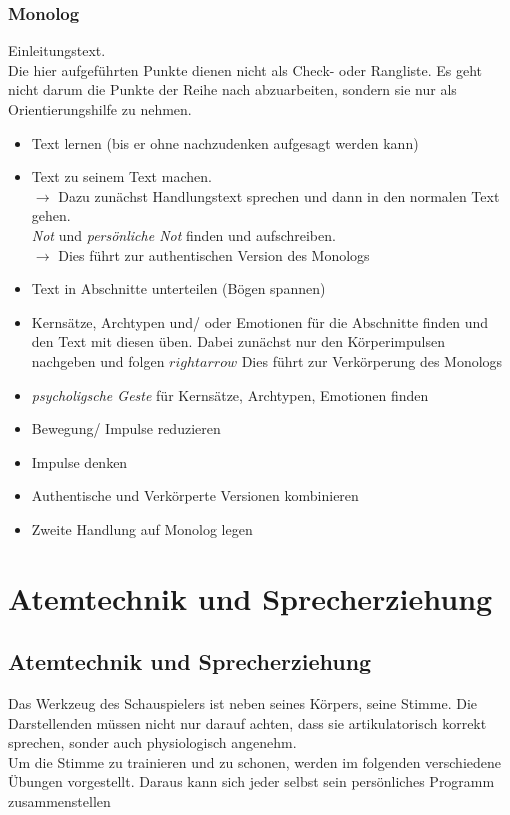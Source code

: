 \documentclass[ngerman, a4paper, twoside]{scrbook}%
\begin{document}
	\section{Monolog}
	Einleitungstext.\\
	Die hier aufgeführten Punkte dienen nicht als Check- oder Rangliste. Es geht nicht darum die Punkte der Reihe nach abzuarbeiten, sondern sie nur als Orientierungshilfe zu nehmen.

	\begin{itemize}
		\item Text lernen (bis er ohne nachzudenken aufgesagt werden kann)
		\item Text zu seinem Text machen.\\
		$\rightarrow$ Dazu zunächst Handlungstext sprechen und dann in den normalen Text gehen.\\
		\emph{Not} und \emph{persönliche Not} finden und aufschreiben.\\
		$\rightarrow$ Dies führt zur authentischen Version des Monologs
		\item Text in Abschnitte unterteilen (Bögen spannen)
		\item Kernsätze, Archtypen und/ oder Emotionen für die Abschnitte finden und den Text mit diesen üben. Dabei zunächst nur den Körperimpulsen nachgeben und folgen $rightarrow$ Dies führt zur Verkörperung des Monologs
		\item \emph{psycholigsche Geste} für Kernsätze, Archtypen, Emotionen finden
		\item Bewegung/ Impulse reduzieren
		\item Impulse denken
		\item Authentische und Verkörperte Versionen kombinieren
		\item Zweite Handlung auf Monolog legen
	\end{itemize}




	\setcounter{chapter}{0}
	\setcounter{section}{0}
	\part{Atemtechnik und Sprecherziehung}
	\chapter{Atemtechnik und Sprecherziehung}
	Das Werkzeug des Schauspielers ist neben seines Körpers, seine Stimme. Die Darstellenden müssen nicht nur darauf achten, dass sie artikulatorisch korrekt sprechen, sonder auch physiologisch angenehm.\\
	Um die Stimme zu trainieren und zu schonen, werden im folgenden verschiedene Übungen vorgestellt. Daraus kann sich jeder selbst sein persönliches Programm zusammenstellen
\end{document}
